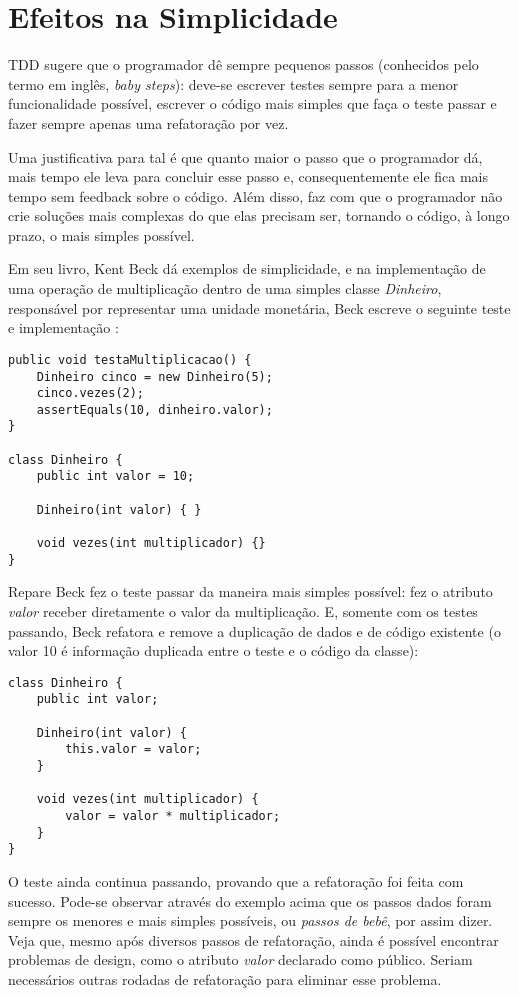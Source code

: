 \section{Efeitos na Simplicidade}

TDD sugere que o programador dê sempre pequenos passos (conhecidos pelo termo em
inglês, \textit{baby steps}): deve-se escrever testes sempre para a menor
funcionalidade possível, escrever o código mais simples que faça o teste passar
e fazer sempre apenas uma refatoração por vez.

Uma justificativa para tal é que quanto maior o passo que o programador dá, mais
tempo ele leva para concluir esse passo e, consequentemente ele fica mais tempo
sem feedback sobre o código. Além disso, faz com que o programador não crie
soluções mais complexas do que elas precisam ser, tornando o código, à longo
prazo, o mais simples possível.

Em seu livro, Kent Beck dá exemplos de simplicidade, e na implementação de uma
operação de multiplicação dentro de uma simples classe \textit{Dinheiro},
responsável por representar uma unidade monetária, Beck escreve o seguinte
teste e implementação \cite{TDDByExample}:

\begin{lstlisting}[frame=trbl]
public void testaMultiplicacao() {
	Dinheiro cinco = new Dinheiro(5);
	cinco.vezes(2);
	assertEquals(10, dinheiro.valor);
}
	
class Dinheiro {
	public int valor = 10;
		
	Dinheiro(int valor) { }
		
	void vezes(int multiplicador) {}
}
\end{lstlisting}

Repare Beck fez o teste passar da maneira mais simples possível: fez o atributo
\textit{valor} receber diretamente o valor da multiplicação. E, somente com os
testes passando, Beck refatora e remove a duplicação de dados e de código
existente (o valor 10 é informação duplicada entre o teste e o código da
classe):

\begin{lstlisting}[frame=trbl]
class Dinheiro {
	public int valor;
	
	Dinheiro(int valor) {
		this.valor = valor;
	}
	
	void vezes(int multiplicador) {
		valor = valor * multiplicador;
	}
}
\end{lstlisting}

O teste ainda continua passando, provando que a refatoração foi feita com
sucesso. Pode-se observar através do exemplo acima que os passos dados foram
sempre os menores e mais simples possíveis, ou \textit{passos de bebê}, por
assim dizer. Veja que, mesmo após diversos passos de refatoração, ainda é
possível encontrar problemas de design, como o atributo \textit{valor}
declarado como público. Seriam necessários outras rodadas de refatoração para
eliminar esse problema.

